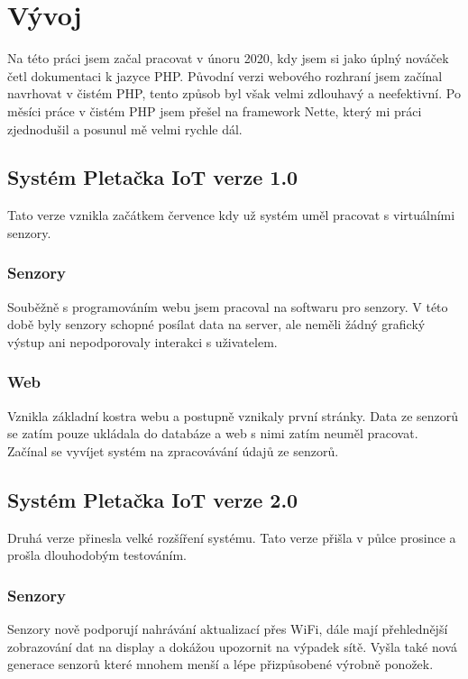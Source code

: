 \chapter{Vývoj}
Na této práci jsem začal pracovat v únoru 2020, kdy jsem si jako úplný nováček četl dokumentaci k jazyce PHP. 
Původní verzi webového rozhraní jsem začínal navrhovat v čistém PHP, tento způsob byl však velmi zdlouhavý a neefektivní.
Po měsíci práce v čistém PHP jsem přešel na framework Nette, který mi práci zjednodušil a posunul mě velmi rychle dál. 


\section{Systém Pletačka IoT verze 1.0}
Tato verze vznikla začátkem července kdy už systém uměl pracovat s virtuálními senzory.


\subsection{Senzory}
Souběžně s programováním webu jsem pracoval na softwaru pro senzory.
V této době byly senzory schopné posílat data na server, ale neměli žádný grafický výstup ani nepodporovaly interakci s uživatelem.

\subsection{Web}
Vznikla základní kostra webu a postupně vznikaly první stránky.
Data ze senzorů se zatím pouze ukládala do databáze a web s nimi zatím neuměl pracovat.
Začínal se vyvíjet systém na zpracovávání údajů ze senzorů.


\newpage

\section{Systém Pletačka IoT verze 2.0}
Druhá verze přinesla velké rozšíření systému.
Tato verze přišla v půlce prosince a prošla dlouhodobým testováním.


\subsection{Senzory}
Senzory nově podporují nahrávání aktualizací přes WiFi, dále mají přehlednější zobrazování dat na display a dokážou upozornit na výpadek sítě.
Vyšla také nová generace senzorů které mnohem menší a lépe přizpůsobené výrobně ponožek.

